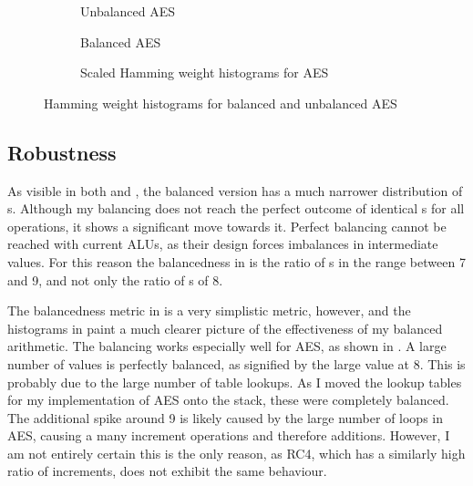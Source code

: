 \begin{figure}[hp]
  \centering
  \begin{subfigure}[b]{0.49\textwidth}
    
    \caption{Unbalanced AES}
  \end{subfigure}
  \begin{subfigure}[b]{0.49\textwidth}
    
    \caption{Balanced AES}
    \label{fig:aes-balanced}
  \end{subfigure}

  \begin{subfigure}[b]{\textwidth}
    
    \caption{Scaled Hamming weight histograms for AES}
    \label{fig:aes-comp}
  \end{subfigure}
  \caption{Hamming weight histograms for balanced and unbalanced AES}
  \label{fig:aes}
\end{figure}

\subsection{Robustness}
As visible in both  and , the balanced version has a much narrower distribution of \hammingw{}s.
Although my balancing does not reach the perfect outcome of identical \hammingw{}s for all operations, it shows a significant move towards it.
Perfect balancing cannot be reached with current ALUs, as their design forces imbalances in intermediate values.
For this reason the balancedness in  is the ratio of \hammingw{}s in the range between 7 and 9, and not only the ratio of \hammingw{}s of 8.

The balancedness metric in  is a very simplistic metric, however, and the histograms in  paint a much clearer picture of the effectiveness of my balanced arithmetic.
The balancing works especially well for AES, as shown in .
A large number of values is perfectly balanced, as signified by the large value at 8.
This is probably due to the large number of table lookups.
As I moved the lookup tables for my implementation of AES onto the stack, these were completely balanced.
The additional spike around 9 is likely caused by the large number of loops in AES, causing a many increment operations and therefore additions.
However, I am not entirely certain this is the only reason, as RC4, which has a similarly high ratio of increments, does not exhibit the same behaviour.

